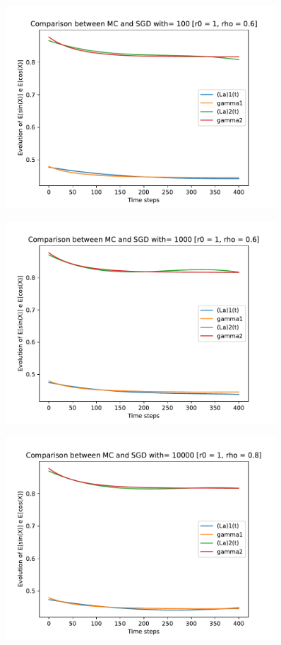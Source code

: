 \documentclass[a4paper,11pt,openright]{report}
\begin{document}
\begin{figure}[H]
\centering
\includegraphics[width=0.9\textwidth]{images/graphics T = 4/n = 3, M = 100 sine and cosine.pdf}
\end{figure}
\begin{figure}[H]
\centering
\includegraphics[width=0.9\textwidth]{images/graphics T = 4/n = 3, M = 1000 sine and cosine.pdf}
\end{figure}
\begin{figure}[H]
\centering
\includegraphics[width=0.9\textwidth]{images/graphics T = 4/n = 3, M = 10000 sine and cosine.pdf}
\end{figure}
\newpage
\end{document}
